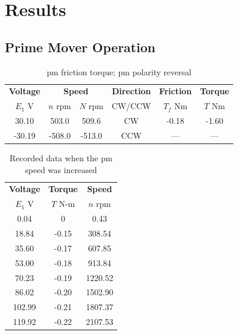 \documentclass{article}
\begin{document}
\section{Results}

\subsection{Prime Mover Operation}

\begin{table}[H]
  \centering
  \begin{tabular}{*{6}{c}}
    \textbf{Voltage} & \multicolumn{2}{c}{\textbf{Speed}} & \textbf{Direction}
    & \textbf{Friction} & \textbf{Torque} \\
    $E_1$ V & $n$ rpm & $N$ rpm & CW/CCW & $T_f$ Nm & $T$ Nm \\
    \hline
     30.10 &  503.0 &  509.6 &  CW & -0.18 & -1.60 \\
    -30.19 & -508.0 & -513.0 & CCW &   --- &   --- \\
  \end{tabular}
  \caption{\gls{pm} friction torque; \gls{pm} polarity reversal}
  \label{tab:table_01}
\end{table}

\begin{table}[H]
  \centering
  \begin{tabular}{*{3}{c}}
    \textbf{Voltage} & \textbf{Torque} & \textbf{Speed} \\
    $E_1$ V          & $T$ N-m         & $n$ rpm \\

    \hline

      0.04 &     0 &    0.43 \\
     18.84 & -0.15 &  308.54 \\
     35.60 & -0.17 &  607.85 \\
     53.00 & -0.18 &  913.84 \\
     70.23 & -0.19 & 1220.52 \\
     86.02 & -0.20 & 1502.90 \\
    102.99 & -0.21 & 1807.37 \\
    119.92 & -0.22 & 2107.53 \\
  \end{tabular}
  \caption{Recorded data when the \gls{pm} speed was increased}
  \label{tab:table_02}
\end{table}
\end{document}
